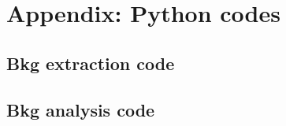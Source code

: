\documentclass{article}
\begin{document}
\newpage
\section{Appendix: Python codes}
\subsection{Bkg extraction code}

\subsection{Bkg analysis code}

\end{document}
